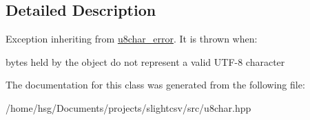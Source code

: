 \subsection{Detailed Description}
Exception inheriting from \hyperlink{classutils_1_1u8char__error}{u8char\+\_\+error}. It is thrown when\+:
\begin{DoxyItemize}
\item bytes held by the object do not represent a valid U\+T\+F-\/8 character 
\end{DoxyItemize}

The documentation for this class was generated from the following file\+:\begin{DoxyCompactItemize}
\item 
/home/hsg/\+Documents/projects/slightcsv/src/u8char.\+hpp\end{DoxyCompactItemize}
